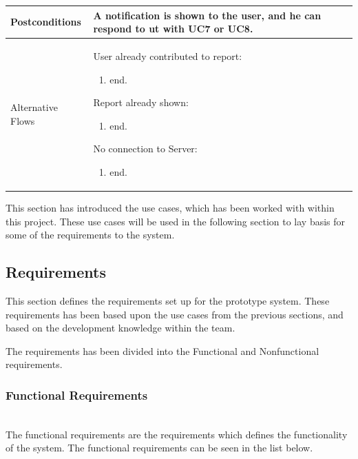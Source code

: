 \begin{table}[p]
\begin{tabularx}{\textwidth}{|l|X|}
Postconditions    & A notification is shown to the user, and he can respond to ut with UC7 or UC8. \\ \hline
Alternative Flows & 
User already contributed to report:
{\footnotesize \begin{enumerate}
\item end.
\end{enumerate}}
Report already shown:
{\footnotesize \begin{enumerate}
\item end.
\end{enumerate}}
No connection to Server:
{\footnotesize \begin{enumerate}
\item end.
\end{enumerate}}
\\ \hline
\end{tabularx}
\end{table}

This section has introduced the use cases, which has been worked with within this project. These use cases will be used in the following section to lay basis for some of the requirements to the system.

\subsection{Requirements}
This section defines the requirements set up for the prototype system. These requirements has been based upon the use cases from the previous sections, and based on the development knowledge within the team.

The requirements has been divided into the Functional and Nonfunctional requirements.

\subsubsection{Functional Requirements}~\\
The functional requirements are the requirements which defines the functionality of the system. The functional requirements can be seen in the list below.

